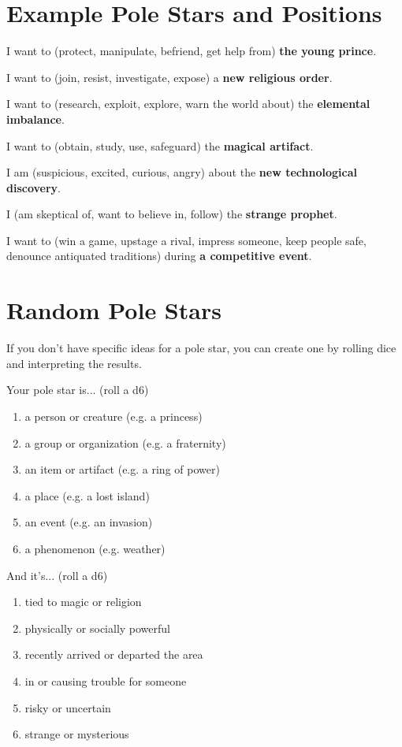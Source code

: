\documentclass[10pt,oneside,letterpaper,landscape]{memoir}
\begin{document}
\begin{multicols}{3}
\vfill\null %

\columnbreak

\section{Example Pole Stars and Positions}

I want to (protect, manipulate, befriend, get help from) \textbf{the young prince}.

I want to (join, resist, investigate, expose) a \textbf{new religious order}.

I want to (research, exploit, explore, warn the world about) the \textbf{elemental imbalance}.

I want to (obtain, study, use, safeguard) the \textbf{magical artifact}.

I am (suspicious, excited, curious, angry) about the \textbf{new technological discovery}.

I (am skeptical of, want to believe in, follow) the \textbf{strange prophet}.

I want to (win a game, upstage a rival, impress someone, keep people safe, denounce antiquated traditions) during \textbf{a competitive event}.

\section{Random Pole Stars}

If you don't have specific ideas for a pole star, you can create one by rolling dice and interpreting the results.

Your pole star is... (roll a d6)

\begin{enumerate}
\item [1:] a person or creature (e.g. a princess)
\item [2:] a group or organization (e.g. a fraternity)
\item [3:] an item or artifact (e.g. a ring of power)
\item [4:] a place (e.g. a lost island)
\item [5:] an event (e.g. an invasion)
\item [6:] a phenomenon (e.g. weather)
\end{enumerate}

And it's... (roll a d6)

\begin{enumerate}
\item [1:] tied to magic or religion
\item [2:] physically or socially powerful
\item [3:] recently arrived or departed the area
\item [4:] in or causing trouble for someone
\item [5:] risky or uncertain
\item [6:] strange or mysterious
\end{enumerate}


\end{multicols}
\end{document}
